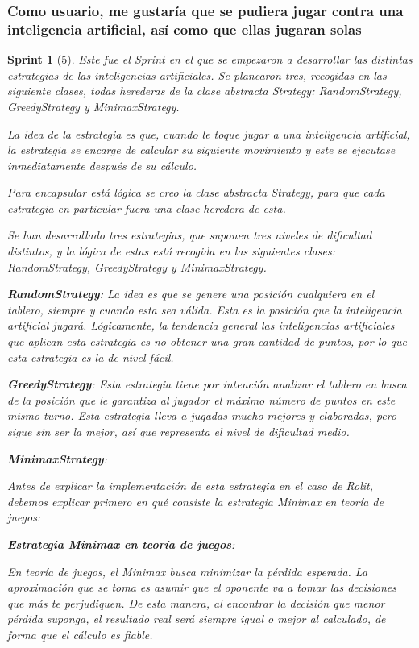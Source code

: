 \documentclass{article}
\theoremstyle{break}
\newtheorem*{sprint}{Sprint}
\begin{document}
\subsubsection{Como usuario, me gustaría que se pudiera jugar contra una inteligencia artificial, así como que ellas jugaran solas}
\begin{sprint}[5]
Este fue el Sprint en el que se empezaron a desarrollar las distintas estrategias de las inteligencias artificiales. Se planearon tres, recogidas en las siguiente clases, todas herederas de la clase abstracta Strategy: RandomStrategy, GreedyStrategy y MinimaxStrategy.

La idea de la estrategia es que, cuando le toque jugar a una inteligencia artificial, la estrategia se encarge de calcular
su siguiente movimiento y este se ejecutase inmediatamente después de su cálculo.

Para encapsular está lógica se creo la clase abstracta Strategy, para que cada estrategia en particular fuera una clase
heredera de esta.

Se han desarrollado tres estrategias, que suponen tres niveles de dificultad distintos, 
y la lógica de estas está recogida en las siguientes clases: RandomStrategy, GreedyStrategy y MinimaxStrategy.

\textbf{RandomStrategy}:
La idea es que se genere una posición cualquiera en el tablero, siempre y cuando esta sea válida. Esta es la posición que la inteligencia artificial jugará.
Lógicamente, la tendencia general las inteligencias artificiales que aplican esta estrategia es no obtener una gran cantidad de puntos, por lo que esta estrategia es la de nivel fácil.

\textbf{GreedyStrategy}:
Esta estrategia tiene por intención analizar el tablero en busca de la posición que le garantiza al jugador el máximo número de puntos en este mismo turno. Esta estrategia lleva a jugadas mucho mejores y elaboradas, pero sigue sin ser la mejor, así que representa el nivel de dificultad medio.

\textbf{MinimaxStrategy}:

Antes de explicar la implementación de esta estrategia en el caso de Rolit, debemos explicar primero en qué consiste la estrategia Minimax en teoría de juegos:

\textbf{Estrategia Minimax en teoría de juegos}: 

En teoría de juegos, el Minimax busca minimizar la pérdida esperada. La aproximación que se toma es asumir que el oponente va a tomar las decisiones que más te perjudiquen. De esta manera, al encontrar la decisión que menor pérdida suponga, el resultado real será siempre igual o mejor al calculado, de forma que el cálculo es fiable.


\end{sprint}
\end{document}

